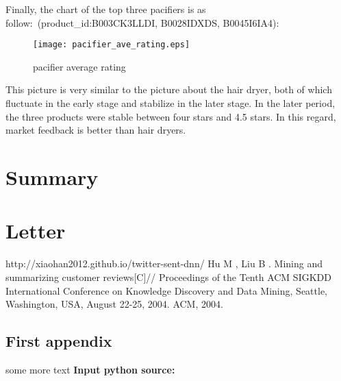 \documentclass{mcmthesis}
\begin{document}
	Finally, the chart of the top three pacifiers is as follow:\ (product\_id:B003CK3LLDI, B0028IDXDS, B0045I6IA4):
	\begin{figure}[H]
		\small
		\centering
		\texttt{[image: pacifier\_ave\_rating.eps]}
		\caption{pacifier average rating} \label{fig:pacifier average rating}
	\end{figure}
	This picture is very similar to the picture about the hair dryer, both of which fluctuate in the early stage and stabilize in the later stage. In the later period, the three products were stable between four stars and 4.5 stars. In this regard, market feedback is better than hair dryers.
	
	
	
	
	\section{Summary}
	
	
	\section{Letter}
	
	
	\begin{thebibliography}{99}
		 http://xiaohan2012.github.io/twitter-sent-dnn/
		 Hu M , Liu B . Mining and summarizing customer reviews[C]// Proceedings of the Tenth ACM SIGKDD International Conference on Knowledge Discovery and Data Mining, Seattle, Washington, USA, August 22-25, 2004. ACM, 2004.
		
	\end{thebibliography}
	
	\begin{appendices}
		
		\section{First appendix}
		
		
		some more text \textcolor[rgb]{0.98,0.00,0.00}{\textbf{Input python source:}}
		
		
	\end{appendices}
\end{document}

